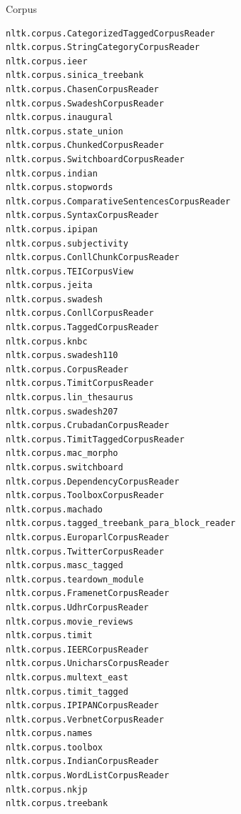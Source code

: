\documentclass[11pt, handout]{beamer}
\begin{document}
\begin{frame}[fragile]{Corpus}
\begin{itemize}
{\begin{verbatim}
nltk.corpus.CategorizedTaggedCorpusReader               nltk.corpus.StringCategoryCorpusReader                  nltk.corpus.ieer                                        nltk.corpus.sinica_treebank
nltk.corpus.ChasenCorpusReader                          nltk.corpus.SwadeshCorpusReader                         nltk.corpus.inaugural                                   nltk.corpus.state_union
nltk.corpus.ChunkedCorpusReader                         nltk.corpus.SwitchboardCorpusReader                     nltk.corpus.indian                                      nltk.corpus.stopwords
nltk.corpus.ComparativeSentencesCorpusReader            nltk.corpus.SyntaxCorpusReader                          nltk.corpus.ipipan                                      nltk.corpus.subjectivity
nltk.corpus.ConllChunkCorpusReader                      nltk.corpus.TEICorpusView                               nltk.corpus.jeita                                       nltk.corpus.swadesh
nltk.corpus.ConllCorpusReader                           nltk.corpus.TaggedCorpusReader                          nltk.corpus.knbc                                        nltk.corpus.swadesh110
nltk.corpus.CorpusReader                                nltk.corpus.TimitCorpusReader                           nltk.corpus.lin_thesaurus                               nltk.corpus.swadesh207
nltk.corpus.CrubadanCorpusReader                        nltk.corpus.TimitTaggedCorpusReader                     nltk.corpus.mac_morpho                                  nltk.corpus.switchboard
nltk.corpus.DependencyCorpusReader                      nltk.corpus.ToolboxCorpusReader                         nltk.corpus.machado                                     nltk.corpus.tagged_treebank_para_block_reader
nltk.corpus.EuroparlCorpusReader                        nltk.corpus.TwitterCorpusReader                         nltk.corpus.masc_tagged                                 nltk.corpus.teardown_module
nltk.corpus.FramenetCorpusReader                        nltk.corpus.UdhrCorpusReader                            nltk.corpus.movie_reviews                               nltk.corpus.timit
nltk.corpus.IEERCorpusReader                            nltk.corpus.UnicharsCorpusReader                        nltk.corpus.multext_east                                nltk.corpus.timit_tagged
nltk.corpus.IPIPANCorpusReader                          nltk.corpus.VerbnetCorpusReader                         nltk.corpus.names                                       nltk.corpus.toolbox
nltk.corpus.IndianCorpusReader                          nltk.corpus.WordListCorpusReader                        nltk.corpus.nkjp                                        nltk.corpus.treebank

\end{verbatim}}
\end{itemize}
\end{frame}
\end{document}
